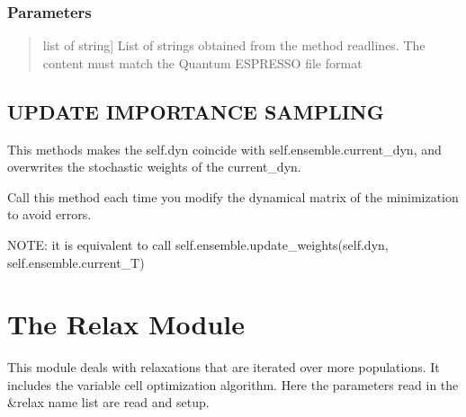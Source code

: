 \documentclass[a4paper,11pt,english]{sphinxmanual}
\begin{document}
\begin{fulllineitems}
\begin{fulllineitems}
\subsubsection{Parameters}
\label{\detokenize{apireference:id38}}\begin{quote}
\begin{description}
\sphinxlineitem{line\_list}{[}list of string{]}
\sphinxAtStartPar
List of strings obtained from the method readlines.
The content must match the Quantum ESPRESSO file format

\end{description}
\end{quote}

\end{fulllineitems}


\begin{fulllineitems}
\label{\detokenize{apireference:sscha.SchaMinimizer.SSCHA_Minimizer.update}}
\pysigstartsignatures
{}
\pysigstopsignatures

\subsection{UPDATE IMPORTANCE SAMPLING}
\label{\detokenize{apireference:update-importance-sampling}}
\sphinxAtStartPar
This methods makes the self.dyn coincide with self.ensemble.current\_dyn, and overwrites the stochastic
weights of the current\_dyn.

\sphinxAtStartPar
Call this method each time you modify the dynamical matrix of the minimization to avoid errors.

\sphinxAtStartPar
NOTE: it is equivalent to call self.ensemble.update\_weights(self.dyn, self.ensemble.current\_T)

\end{fulllineitems}


\end{fulllineitems}



\section{The Relax Module}
\label{\detokenize{apireference:the-relax-module}}
\sphinxAtStartPar
This module deals with relaxations that are iterated over more populations. It includes the variable cell optimization algorithm.
Here the parameters read in the \&relax name list are read and setup.
\end{document}
